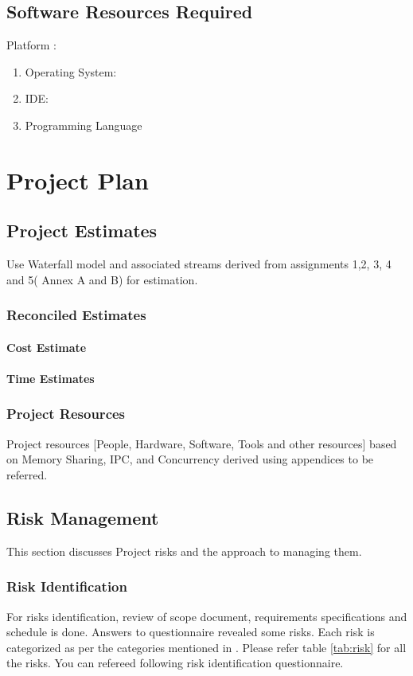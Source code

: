 \documentclass[oneside,a4paper,12pt]{report}
\begin{document}
\section{Software Resources Required}
Platform : 
\begin{enumerate}
\item Operating System: 
\item IDE: 
\item Programming Language
\end{enumerate}




\chapter{Project Plan}

\section{Project Estimates}
                 Use Waterfall model and associated streams derived from assignments 1,2, 3, 4 and 5( Annex A and B) for estimation. 
\subsection{Reconciled Estimates}
\subsubsection{Cost Estimate}

\subsubsection{Time Estimates}


\subsection{Project Resources}
          Project resources  [People, Hardware, Software, Tools and other resources] based on Memory Sharing, IPC, and Concurrency derived using appendices to be referred. 

\section{Risk Management }
This section discusses Project risks and the approach to managing them.
\subsection{Risk Identification}
For risks identification, review of scope document, requirements specifications and schedule is done. Answers to questionnaire revealed some risks. Each risk is categorized as per the categories mentioned in \cite{bookPressman}. Please refer table \ref{tab:risk} for all the risks. You can refereed following risk identification questionnaire.
\end{document}
